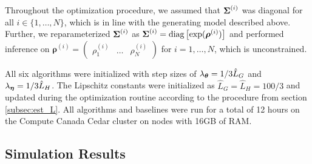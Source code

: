 Throughout the optimization procedure, we assumed that $\boldsymbol{\Sigma}^{(i)}$ was diagonal for all $i \in \{1,\ldots,N\}$, which is in line with the generating model described above. Further, we reparameterized $\boldsymbol{\Sigma}^{(i)}$ as 
%
    $\boldsymbol{\Sigma}^{(i)} = \text{diag}\left[\exp(\boldsymbol{\rho}^{(i)})\right]$
%
and performed inference on $\boldsymbol{\rho}^{(i)} = \begin{pmatrix} \rho^{(i)}_1 & \ldots & \rho^{(i)}_N \end{pmatrix}$ for $i = 1,\ldots,N$, which is unconstrained.

All six algorithms were initialized with step sizes of $\lambda_{\boldsymbol{\theta}} = 1/3 \hat L_G$ and $\lambda_{\boldsymbol{\eta}} = 1/3 \hat L_H$. The Lipschitz constants were initialized as $\hat L_G = \hat L_H = 100/3$ and updated during the optimization routine according to the procedure from section \ref{subsec:est_L}. 
%
All algorithms and baselines were run for a total of 12 hours on the Compute Canada Cedar cluster on nodes with 16GB of RAM.

\subsection{Simulation Results}

